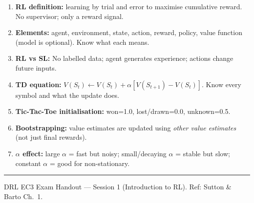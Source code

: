 \documentclass[11pt,a4paper]{article}
\begin{document}
\begin{tcolorbox}[exam={Must-Know Points — Session 1}]
\begin{enumerate}
  \item \textbf{RL definition:} learning by trial and error to maximise cumulative reward.
    No supervisor; only a reward signal.
  \item \textbf{Elements:} agent, environment, state, action, reward, policy, value function
    (model is optional). Know what each means.
  \item \textbf{RL vs SL:} No labelled data; agent generates experience; actions change future inputs.
  \item \textbf{TD equation:} $V(S_t) \leftarrow V(S_t) + \alpha[V(S_{t+1}) - V(S_t)]$.
    Know every symbol and what the update does.
  \item \textbf{Tic-Tac-Toe initialisation:} won=1.0, lost/drawn=0.0, unknown=0.5.
  \item \textbf{Bootstrapping:} value estimates are updated using \emph{other value estimates}
    (not just final rewards).
  \item \textbf{$\alpha$ effect:} large $\alpha$ = fast but noisy; small/decaying $\alpha$ =
    stable but slow; constant $\alpha$ = good for non-stationary.
\end{enumerate}
\end{tcolorbox}

\vspace{4pt}
\hrule
\vspace{3pt}
{\footnotesize DRL EC3 Exam Handout — Session 1 (Introduction to RL). Ref: Sutton \& Barto Ch.~1.}
\end{document}
